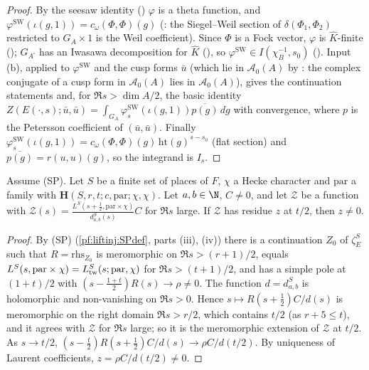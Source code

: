 \begin{proof}
By the seesaw identity () $\varphi$ is a theta function, and
$\varphi^{\mathrm{SW}}(\iota(g,1))=c_\omega(\Phi,\Phi)(g)$ (: the
Siegel--Weil section of $\delta(\Phi_1,\Phi_2)$ restricted to $G_A\times1$ is the Weil coefficient). Since $\Phi$ is a Fock vector, $\varphi$ is
$\hat K$-finite (); $G_{A^\square}$ has an Iwasawa decomposition for $\hat K$
(), so $\varphi^{\mathrm{SW}}\in I(\chi_B^{-1},s_0)$
(). Input (b), applied to $\varphi^{\mathrm{SW}}$ and the cusp forms
$\bar u$ (which lie in $\mathcal A_0(A)$ by : the complex conjugate of a cusp form
in $\mathcal A_0(A)$ lies in $\mathcal A_0(A)$), gives the continuation statements and, for $\Re s>\dim A/2$, the basic identity
$Z(E(\cdot,s);\bar u,\bar u)=\int_{G_A}\varphi^{\mathrm{SW}}_s(\iota(g,1))\overline{p(g)}\,dg$ with convergence, where $p$ is the Petersson coefficient
of $(\bar u,\bar u)$. Finally $\varphi^{\mathrm{SW}}_s(\iota(g,1))=c_\omega(\Phi,\Phi)(g)\,\mathrm{ht}(g)^{s-s_0}$ (flat section) and
$\overline{p(g)}=r(u,u)(g)$, so the integrand is $I_s$.
\end{proof}

\begin{lemma}\label{pf:liftinj:resne}
Assume (SP). Let $S$ be a finite set of places of $F$, $\chi$ a Hecke character and $\mathrm{par}$ a family with
$\mathbf H(S,r,t;c,\mathrm{par};\chi,\chi)$. Let $a,b\in\N$, $C\ne0$, and let $\mathcal Z$ be a function with
$\mathcal Z(s)=\frac{L^S(s+\frac12,\mathrm{par}\times\chi)}{d^S_{a,b}(s)}C$ for $\Re s$ large. If $\mathcal Z$ has residue $z$ at $t/2$, then $z\ne0$.
\end{lemma}

\begin{proof}
By (SP) (\cref{pf:liftinj:SPdef}, parts (iii), (iv)) there is a continuation $Z_0$ of $\zeta^S_E$ such that $R=\mathrm{rhs}_{Z_0}$ is meromorphic on
$\Re s>(r+1)/2$, equals $L^S(s,\mathrm{par}\times\chi)=L^{S}_{\mathrm{tw}}(s;\mathrm{par},\chi)$ for $\Re s>(t+1)/2$, and has a simple pole at $(1+t)/2$
with $(s-\frac{1+t}2)R(s)\to\rho\ne0$. The function $d=d^S_{a,b}$ is holomorphic and non-vanishing on $\Re s>0$. Hence $s\mapsto R(s+\frac12)C/d(s)$
is meromorphic on the right domain $\Re s>r/2$, which contains $t/2$ (as $r+5\le t$), and it agrees with $\mathcal Z$ for $\Re s$ large; so it is the
meromorphic extension of $\mathcal Z$ at $t/2$. As $s\to t/2$, $(s-\frac t2)R(s+\frac12)C/d(s)\to\rho C/d(t/2)$. By uniqueness of Laurent
coefficients, $z=\rho C/d(t/2)\ne0$.
\end{proof}

